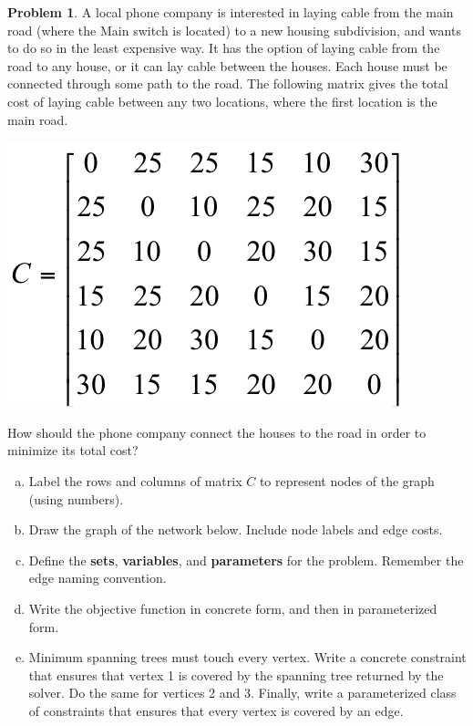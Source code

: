 \documentclass[11pt]{article}
\theoremstyle{definition}
\newtheorem{problem}{Problem}
\newcommand{\answerbox}[3]{%
  \fbox{%
    \begin{minipage}[#1]{#2}
      \hfill\vspace{#3}
    \end{minipage}
  }
}
\newcommand{\answerboxone}[2]{%
  \answerbox{#1}{6.0in}{#2} 
}
\begin{document}
\begin{problem}
A local phone company is interested in laying cable from the main road (where the
Main switch is located) to a new housing subdivision, and wants to do so in the least
expensive way.  It has the option of laying cable from the road to any house, or it can 
lay cable between the houses.  Each house must be connected through some path to 
the road.  The following matrix gives the total cost of laying cable between any two
locations, where the first location is the main road.

\begin{center}
\includegraphics[width = .3\textwidth]{costs}
\end{center}

How should the phone company connect the houses to the road in order to minimize its
total cost?

\begin{enumerate}[(a)]
\item Label the rows and columns of matrix $C$ to represent nodes of the graph (using numbers). 
\item Draw the graph of the network below.  Include node labels and edge costs.

\answerboxone{c}{10cm}

\newpage
\item Define the \textbf{sets}, \textbf{variables}, and \textbf{parameters} for the problem.  Remember the edge naming convention.

\answerboxone{c}{8cm}

\item Write the objective function in concrete form, and then in parameterized form.

\answerboxone{c}{8cm}

\newpage
\item Minimum spanning trees must touch every vertex.  Write a concrete constraint that ensures that vertex 1 is covered by the spanning tree returned by the solver.  Do the same for vertices 2 and 3.  Finally, write a parameterized class of constraints that ensures that every vertex is covered by an edge.

\answerboxone{c}{8cm}


\end{enumerate}
\end{problem}
\end{document}
